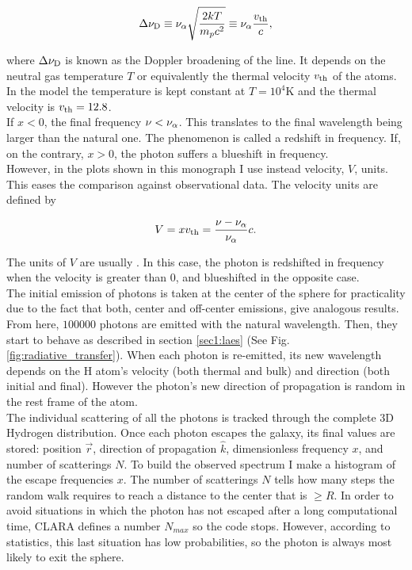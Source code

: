 \begin{equation}
\label{eq:delta_nuD}
\Delta\nu_{\rm D} \equiv \nu_{\rm \alpha}\sqrt{\frac{2kT}{m_pc^2}} \equiv \nu_{\rm \alpha} \frac{v_{\rm th}}{c},
\end{equation} 

where $\Delta\nu_{\rm D}$ is known as the Doppler broadening of the \lya line. It depends on the neutral gas temperature $T$ or equivalently the thermal velocity $v_{\rm th}$ of the atoms. In the model the temperature is kept constant at $T=10^4$K and the thermal velocity is $v_{\rm th}=12.8$\kms. \\

If $x < 0$, the final frequency $\nu < \nu_{\rm \alpha}$. This translates to the final wavelength being larger than the \lya natural one. The phenomenon is called a redshift in frequency. If, on the contrary, $x > 0$, the photon suffers a blueshift in frequency. \\

However, in the plots shown in this monograph I use instead velocity, $V$, units. This eases the comparison against observational data. The velocity units are defined by

\begin{equation}
\label{eq:V}
V = xv_{\rm th} = \frac{\nu -\nu_{\rm \alpha}}{\nu_{\rm \alpha}}c.
\end{equation}

The units of $V$ are usually \kms. In this case, the photon is redshifted in frequency when the velocity is greater than 0, and blueshifted in the opposite case. \\

The initial emission of photons is taken at the center of the sphere for practicality due to the fact that both, center and off-center emissions, give analogous results. From here, $100000$ photons are emitted with the natural \lya wavelength. Then, they start to behave as described in section \ref{sec1:laes} (See Fig. \ref{fig:radiative_transfer}). When each photon is re-emitted, its new wavelength depends on the H atom's velocity (both thermal and bulk) and direction (both initial and final). However the photon's new direction of propagation is random in the rest frame of the atom. \\ 

The individual scattering of all the photons is tracked through the complete 3D Hydrogen distribution. Once each photon escapes the galaxy, its final values are stored: position $\vec{r}$, direction of propagation $\hat{k}$, dimensionless frequency $x$, and number of scatterings $N$. To build the observed spectrum I make a histogram of the escape frequencies $x$. The number of scatterings $N$ tells how many steps the random walk requires to reach a distance to the center that is $\geq R$. In order to avoid situations in which the photon has not escaped after a long computational time, CLARA defines a number $N_{max}$ so the code stops. However, according to statistics, this last situation has low probabilities, so the photon is always most likely to exit the sphere. \\

